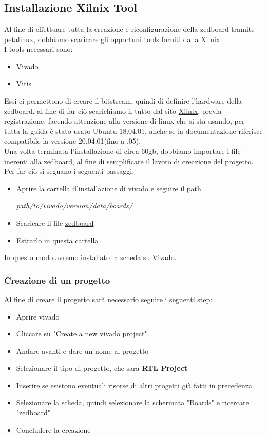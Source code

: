 \chapter{}

\section{Installazione Xilnix Tool}
\label{app:a}
Al fine di effettuare tutta la creazione e riconfigurazione della zedboard tramite petalinux, dobbiamo scaricare gli opportuni tools forniti dalla Xilnix.\\
I tools necessari sono:
\begin{itemize}
\item Vivado
\item Vitis
\end{itemize}
Essi ci permettono di creare il bitstream, quindi di definire l'hardware della zedboard, al fine di far ciò scarichiamo il tutto dal sito \href{https://www.xilinx.com/support/download/index.html/content/xilinx/en/downloadNav/vivado-design-tools.html}{Xilnix}, previa registrazione, facendo attenzione alla versione di linux che si sta usando, per tutta la guida è stato usato Ubuntu 18.04.01, anche se la documentazione riferisce compatibile la versione 20.04.01(fino a .05).\\
Una volta terminata l'installazione di circa 60gb, dobbiamo importare i file inerenti alla zedboard, al fine di semplificare il lavoro di creazione del progetto. Per far ciò si seguano i seguenti passaggi:
\begin{itemize}
\item Aprire la cartella d'installazione di vivado e seguire il path
\begin{center}
\textit{path/to/vivado/version/data/boards/}
\end{center}
\item Scaricare il file \href{https://github.com/Digilent/vivado-boards/archive/master.zip}{zedboard}
\item Estrarlo in questa cartella
\end{itemize}
In questo modo avremo installato la scheda su Vivado.
\subsection{Creazione di un progetto}
\label{CreazioneVivado}
Al fine di creare il progetto sarà necessario seguire i seguenti step:
\begin{itemize}
\item Aprire vivado
\item Cliccare su "Create a new vivado project"
\item Andare avanti e dare un nome al progetto
\item Selezionare il tipo di progetto, che sara \textbf{RTL Project}
\item Inserire se esistono eventuali risorse di altri progetti già fatti in precedenza
\item Selezionare la scheda, quindi selezionare la schermata "Boards" e ricercare "zedboard"
\item Concludere la creazione
\end{itemize}
